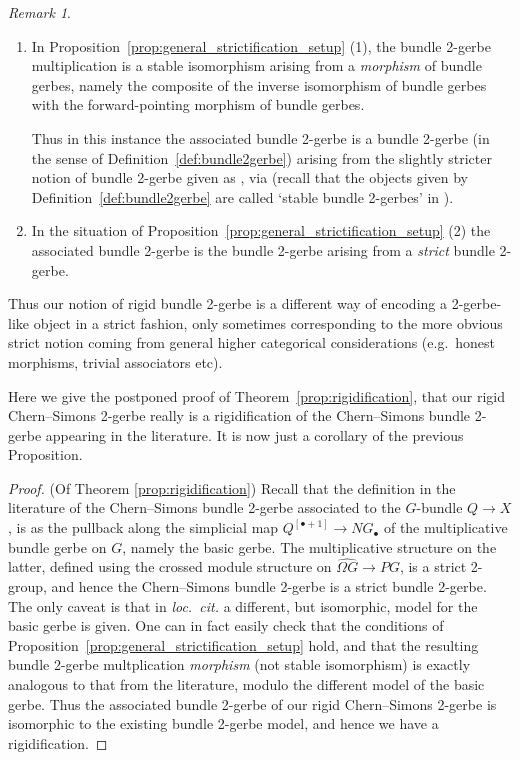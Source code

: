 \documentclass[12pt]{amsart}
\theoremstyle{plain}
\theoremstyle{definition}
\theoremstyle{remark}
\newtheorem{remark}[theorem]{Remark}
\numberwithin{equation}{section}
\newcommand{\<}{\langle}
\renewcommand{\>}{\rangle}
\begin{document}
\begin{remark}

 \begin{enumerate}
 \item In Proposition~\ref{prop:general_strictification_setup} (1), the bundle 2-gerbe multiplication is a stable isomorphism arising from a \emph{morphism} of bundle gerbes, namely the composite of the inverse isomorphism of bundle gerbes with the forward-pointing morphism of bundle gerbes.
 
 Thus in this instance the associated bundle 2-gerbe is a bundle 2-gerbe (in the sense of Definition~\ref{def:bundle2gerbe}) arising from the slightly stricter notion of bundle 2-gerbe given as \cite[Definition~7.2]{StevPhD}, via \cite[Note 7.1.1]{StevPhD} (recall that the objects given by Definition~\ref{def:bundle2gerbe} are called `stable bundle 2-gerbes' in \cite{StevPhD}).

 \item In the situation of Proposition~\ref{prop:general_strictification_setup} (2) the associated bundle 2-gerbe is the bundle 2-gerbe arising from a \emph{strict} bundle 2-gerbe.
 \end{enumerate}

 Thus our notion of rigid bundle 2-gerbe is a different way of encoding a 2-gerbe-like object in a strict fashion, only sometimes corresponding to the more obvious strict notion coming from general higher categorical considerations (e.g.\ honest morphisms, trivial associators etc).
 \end{remark}

Here we give the postponed proof of Theorem~\ref{prop:rigidification}, that our rigid Chern--Simons 2-gerbe really is a rigidification of the Chern--Simons bundle 2-gerbe appearing in the literature. It is now just a corollary of the previous Proposition.



\begin{proof}{(Of Theorem \ref{prop:rigidification})}
Recall that the definition in the literature of the Chern--Simons bundle 2-gerbe associated to the $G$-bundle $Q\to X$ \cite[\S 9.3]{StevPhD}, \cite[Definition 6.5]{CJMSW} is as the pullback along the simplicial map $Q^{[\bullet+1]} \to NG_\bullet$ of the multiplicative bundle gerbe on $G$, namely the basic gerbe. 
The multiplicative structure on the latter, defined using the crossed module structure on $\widehat{\Omega G} \to PG$, is a strict 2-group, and hence the Chern--Simons bundle 2-gerbe is a strict bundle 2-gerbe. 
The only caveat is that in \emph{loc.\ cit.} a different, but isomorphic, model for the basic gerbe is given. 
One can in fact easily check that the conditions of Proposition~\ref{prop:general_strictification_setup} hold, and that the resulting bundle 2-gerbe multplication \emph{morphism} (not stable isomorphism) is exactly analogous to that from the literature, modulo the different model of the basic gerbe. 
Thus the associated bundle 2-gerbe of our rigid Chern--Simons 2-gerbe is isomorphic to the existing bundle 2-gerbe model, and hence we have a rigidification.
\end{proof}
\end{document}
